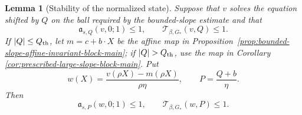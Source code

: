 \documentclass[11pt,reqno]{amsart}
\numberwithin{equation}{section}
\newtheorem{lemma}[theorem]{Lemma}
\theoremstyle{remark}
\begin{document}
\begin{lemma}[Stability of the normalized state]
\label{lem:affine-invariant-state-reproduction-main}
Suppose that \(v\) solves the equation shifted by \(Q\) on the ball
required by the bounded-slope estimate and that
\begin{equation}
 \mathfrak a_{s,Q}(v,0;1)\le1,
 \qquad \mathcal T_{\beta,G_*}(v,Q)\le1.
 \label{eq:affine-route-unit-assumptions-main}
\end{equation}
If \(|Q|\le Q_{\rm th}\), let \(m=c+b\cdot X\) be the affine map in
Proposition~\ref{prop:bounded-slope-affine-invariant-block-main}; if
\(|Q|>Q_{\rm th}\), use the map in Corollary
\ref{cor:prescribed-large-slope-block-main}.  Put
\begin{equation}
 w(X)=\frac{v(\rho X)-m(\rho X)}{\rho\eta},
 \qquad P=\frac{Q+b}{\eta}.
 \label{eq:affine-route-renormalized-profile-main}
\end{equation}
Then
\begin{equation}
 \mathfrak a_{s,P}(w,0;1)\le1,\qquad
 \mathcal T_{\beta,G_*}(w,P)\le1.
 \label{eq:affine-route-unit-reproduction-main}
\end{equation}
\end{lemma}
\end{document}
